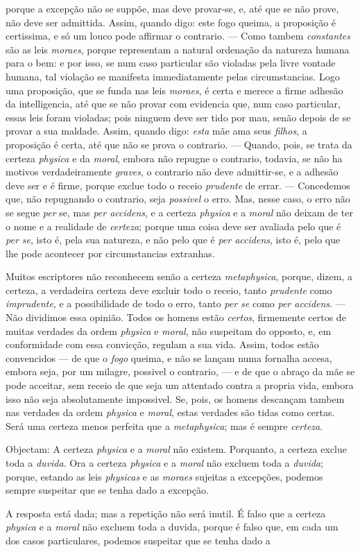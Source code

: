 porque a excepção não se suppõe, mas deve provar-se, e, até que se não prove, não deve ser admittida. Assim, quando digo: este fogo queima, a proposição é certissima, e só um louco pode affirmar o contrario. --- Como tambem \emph{constantes} são as leis \emph{moraes}, porque representam a natural ordenação da natureza humana para o bem: e por isso, se num caso particular são violadas pela livre vontade humana, tal violação se manifesta immediatamente pelas circumstancias. Logo uma proposição, que se funda nas leis \emph{moraes}, é certa e merece a firme adhesão da intelligencia, até que se não provar com evidencia que, num caso particular, essas leis foram violadas; pois ninguem deve ser tido por mau, senão depois de se provar a sua maldade. Assim, quando digo: \emph{esta} mãe ama seus \emph{filhos}, a proposição é certa, até que não se prova o contrario. --- Quando, pois, se trata da certeza \emph{physica} e da \emph{moral}, embora não repugne o contrario, todavia, se não ha motivos verdadeiramente \emph{graves}, o contrario não deve admittir-se, e a adhesão deve ser e é firme, porque exclue todo o receio \emph{prudente} de errar. --- Concedemos que, não repugnando o contrario, seja \emph{possivel} o erro. Mas, nesse caso, o erro não se segue \emph{per} se, mas \emph{per accidens}, e a certeza \emph{physica} e a \emph{moral} não deixam de ter o nome e a realidade de \emph{certeza}; porque uma coisa deve ser avaliada pelo que é \emph{per se}, isto é, pela sua natureza, e não pelo que é \emph{per accidens}, isto é, pelo que lhe pode acontecer por circumstancias extranhas.\par Muitos escriptores não reconhecem senão a certeza \emph{metaphysica}, porque, dizem, a certeza, a verdadeira certeza deve excluir todo o receio, tanto \emph{prudente} como \emph{imprudente}, e a possibilidade de todo o erro, tanto \emph{per se} como \emph{per accidens}. --- Não dividimos essa opinião. Todos os homens estão \emph{certos}, firmemente certos de muitas verdades da ordem \emph{physica} e \emph{moral}, não suspeitam do opposto, e, em conformidade com essa convicção, regulam a sua vida. Assim, todos estão convencidos --- de que o \emph{fogo} queima, e não se lançam numa fornalha accesa, embora seja, por um milagre, possivel o contrario, --- e de que o abraço da mãe se pode acceitar, sem receio de que seja um attentado contra a propria vida, embora isso não seja absolutamente impossivel. Se, pois, os homens descançam tambem nas verdades da ordem \emph{physica} e \emph{moral}, estas verdades são tidas como certas. Será uma certeza menos perfeita que a \emph{metaphysica}; mas é sempre \emph{certeza}.\par Objectam: A certeza \emph{physica} e a \emph{moral} não existem. Porquanto, a certeza exclue toda a \emph{duvida}. Ora a certeza \emph{physica} e a \emph{moral} não excluem toda a \emph{duvida}; porque, estando as leis \emph{physicas} e as \emph{moraes} sujeitas a excepções, podemos sempre suspeitar que se tenha dado a excepção.\par A resposta está dada; mas a repetição não será inutil. É falso que a certeza \emph{physica} e a \emph{moral} não excluem toda a duvida, porque é falso que, em cada um dos casos particulares, podemos suspeitar que se tenha dado a 